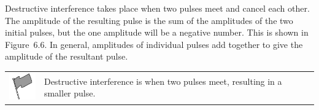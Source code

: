       \label{m38802*id316190}Destructive interference takes place when two pulses meet and cancel each other. The amplitude of the resulting pulse is the sum of the amplitudes of the two initial pulses, but the one amplitude will be a negative number. This is shown in Figure~6.6. In general, amplitudes of individual pulses add together to give the amplitude of the resultant pulse.\par 
\label{m38802*fhsst!!!underscore!!!id578}\begin{definition}
	  \begin{tabular*}{15 cm}{m{15 mm}m{}}
	\hspace*{-50pt}  \includegraphics[width=0.5in]{col11305.imgs/psflag2.png}   & \Definition{   \label{id2436357}\textbf{ Destructive interference}} { \label{m38802*meaningfhsst!!!underscore!!!id578}
      Destructive interference is when two pulses meet, resulting in a smaller pulse. 
       } 
      \end{tabular*}
      \end{definition}

      
    \setcounter{subfigure}{0}



